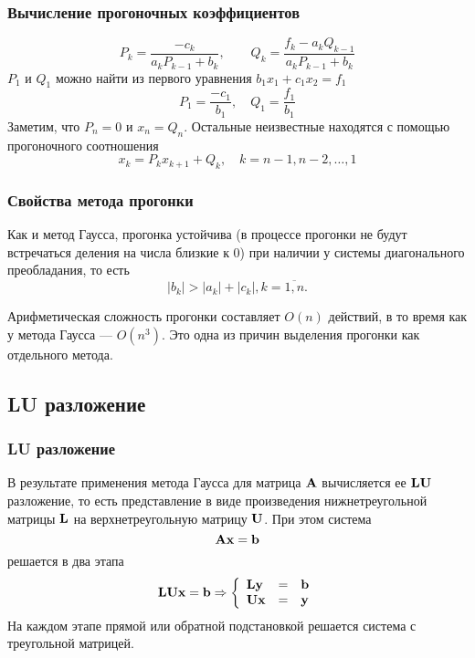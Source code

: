 \documentclass[apectratio=43,unicode]{beamer}
\begin{document}
\begin{frame}\frametitle{Вычисление прогоночных коэффициентов}
	\[
	P_{k} = \frac{-c_k}{a_k P_{k-1} + b_k}, \qquad Q_{k} = \frac{f_k - a_k
Q_{k-1}}{a_k P_{k-1} + b_k}
	\]
	$P_1$ и $Q_1$ можно найти из первого уравнения $b_1 x_1 + c_1 x_2 = f_1$
	\[
	P_1 = \frac{-c_1}{b_1}, \quad Q_1 = \frac{f_1}{b_1}
	\]
	Заметим, что $P_{n} = 0$ и $x_n = Q_{n}$.
	Остальные неизвестные находятся с помощью прогоночного соотношения
	\[
	x_{k} = P_k x_{k+1} + Q_k, \quad k = n-1, n-2, \dots, 1
	\]
\end{frame}

\begin{frame}\frametitle{Свойства метода прогонки}
	Как и метод Гаусса, прогонка устойчива (в процессе прогонки не будут встречаться деления на числа близкие к 0) при наличии
	у системы диагонального преобладания, то есть
	$$|b_k| > |a_k| + |c_k|, k=\overline{1,n}.$$

	Арифметическая сложность прогонки составляет $O(n)$ действий, в то время как у метода Гаусса --- $O(n^3)$. Это одна из причин
	выделения прогонки как отдельного метода.
\end{frame}

\subsection{LU разложение}
\begin{frame}\frametitle{LU разложение}
	В результате применения метода Гаусса для матрица $\mathbf{A}$ вычисляется ее $\mathbf{L}\mathbf{U}$ разложение, то есть представление в виде произведения
	нижнетреугольной матрицы $\mathbf{L}$ на верхнетреугольную матрицу $\mathbf{U}$. При этом система
	\[
	\mathbf{A}\mathbf{x} = \mathbf{b}
	\]
	решается в два этапа
	\[
	\mathbf{L}\mathbf{U} \mathbf{x} = \mathbf{b} \Rightarrow \left\{
	\begin{array}{lcl}
	\mathbf{L} \mathbf{y} &=& \mathbf{b}\\
	\mathbf{U} \mathbf{x} &=& \mathbf{y}\\
	\end{array}
	\right.
	\]
	На каждом этапе прямой или обратной подстановкой решается система с треугольной матрицей.
\end{frame}
\end{document}
